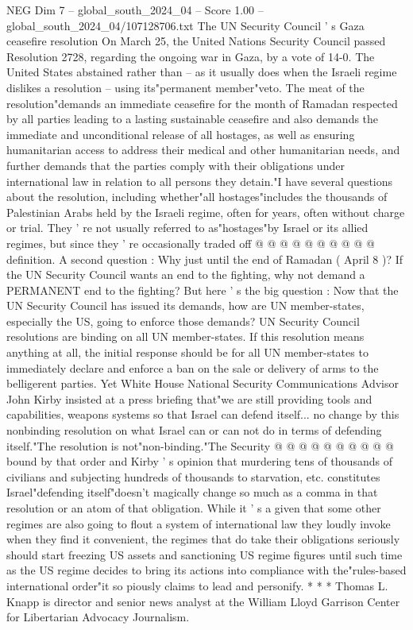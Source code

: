 \begin{textsample}{NEG Dim 7 – global\_south\_2024\_04 – Score 1.00 – global\_south\_2024\_04/107128706.txt}  \label{ex:f7_neg_286}
The UN Security Council ' s Gaza ceasefire resolution On March 25, the United Nations Security Council passed Resolution 2728, regarding the ongoing war in Gaza, by a vote of 14-0.
The United States abstained rather than -- as it usually does when the Israeli regime dislikes a resolution -- using its"permanent member"veto.
The meat of the resolution"demands an immediate ceasefire for the month of Ramadan respected by all parties leading to a lasting sustainable ceasefire and also demands the immediate and unconditional release of all hostages, as well as ensuring humanitarian access to address their medical and other humanitarian needs, and further demands that the parties comply with their obligations under international law in relation to all persons they detain."I have several questions about the resolution, including whether"all hostages"includes the thousands of Palestinian Arabs held by the Israeli regime, often for years, often without charge or trial.
They ' re not usually referred to as"hostages"by Israel or its allied regimes, but since they ' re occasionally traded off @ @ @ @ @ @ @ @ @ @ definition.
A second question : Why just until the end of Ramadan ( April 8 )?
If the UN Security Council wants an end to the fighting, why not demand a PERMANENT end to the fighting?
But here ' s the big question : Now that the UN Security Council has issued its demands, how are UN member-states, especially the US, going to enforce those demands?
UN Security Council resolutions are binding on all UN member-states.
If this resolution means anything at all, the initial response should be for all UN member-states to immediately declare and enforce a ban on the sale or delivery of arms to the belligerent parties.
Yet White House National Security Communications Advisor John Kirby insisted at a press briefing that"we are still providing tools and capabilities, weapons systems so that Israel can defend itself... no change by this nonbinding resolution on what Israel can or can not do in terms of defending itself."The resolution is not"non-binding."The Security @ @ @ @ @ @ @ @ @ @ bound by that order and Kirby ' s opinion that murdering tens of thousands of civilians and subjecting hundreds of thousands to starvation, etc. constitutes Israel"defending itself"doesn't magically change so much as a comma in that resolution or an atom of that obligation.
While it ' s a given that some other regimes are also going to flout a system of international law they loudly invoke when they find it convenient, the regimes that do take their obligations seriously should start freezing US assets and sanctioning US regime figures until such time as the US regime decides to bring its actions into compliance with the"rules-based international order"it so piously claims to lead and personify. * * * Thomas L.
Knapp is director and senior news analyst at the William Lloyd Garrison Center for Libertarian Advocacy Journalism.

\end{textsample}
